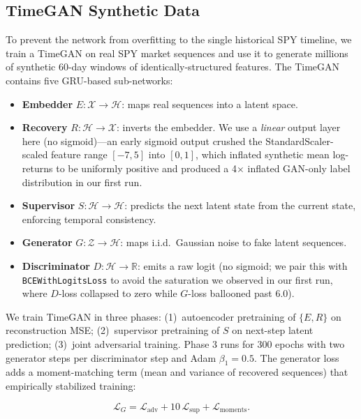 \documentclass[conference]{IEEEtran}
\begin{document}
\subsection{TimeGAN Synthetic Data}

To prevent the network from overfitting to the single
historical SPY timeline, we train a TimeGAN on real SPY market
sequences and use it to generate millions of synthetic
60-day windows of identically-structured features. The TimeGAN
contains five GRU-based sub-networks:

\begin{itemize}
\item \textbf{Embedder} $E: \mathcal{X} \to \mathcal{H}$:
maps real sequences into a latent space.
\item \textbf{Recovery} $R: \mathcal{H} \to \mathcal{X}$:
inverts the embedder. We use a \emph{linear} output layer here
(no sigmoid)---an early sigmoid output crushed the
StandardScaler-scaled feature range $[-7, 5]$ into $[0, 1]$,
which inflated synthetic mean log-returns to be uniformly
positive and produced a 4$\times$ inflated GAN-only label
distribution in our first run.
\item \textbf{Supervisor} $S: \mathcal{H} \to \mathcal{H}$:
predicts the next latent state from the current state, enforcing
temporal consistency.
\item \textbf{Generator} $G: \mathcal{Z} \to \mathcal{H}$:
maps i.i.d.\ Gaussian noise to fake latent sequences.
\item \textbf{Discriminator} $D: \mathcal{H} \to \mathbb{R}$:
emits a raw logit (no sigmoid; we pair this with
\texttt{BCEWithLogitsLoss} to avoid the saturation we observed
in our first run, where $D$-loss collapsed to zero while
$G$-loss ballooned past 6.0).
\end{itemize}

We train TimeGAN in three phases: (1)~autoencoder pretraining
of $\{E, R\}$ on reconstruction MSE; (2)~supervisor pretraining
of $S$ on next-step latent prediction; (3)~joint adversarial
training. Phase 3 runs for 300 epochs with two generator steps
per discriminator step and Adam $\beta_1 = 0.5$. The generator
loss adds a moment-matching term (mean and variance of recovered
sequences) that empirically stabilized training:

\begin{equation}
\mathcal{L}_G = \mathcal{L}_{\text{adv}} + 10\,\mathcal{L}_{\text{sup}} + \mathcal{L}_{\text{moments}}.
\end{equation}
\end{document}
